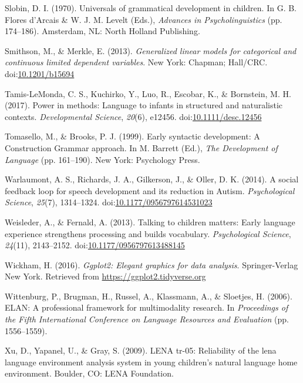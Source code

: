 \documentclass[,man,mask,floatsintext]{apa6}
\begin{document}
\hypertarget{ref-slobin1970universals}{}
Slobin, D. I. (1970). Universals of grammatical development in children.
In G. B. Flores d'Arcais \& W. J. M. Levelt (Eds.), \emph{Advances in
Psycholinguistics} (pp. 174--186). Amsterdam, NL: North Holland
Publishing.

\hypertarget{ref-smithson2013generalized}{}
Smithson, M., \& Merkle, E. (2013). \emph{Generalized linear models for
categorical and continuous limited dependent variables}. New York:
Chapman; Hall/CRC.
doi:\href{https://doi.org/10.1201/b15694}{10.1201/b15694}

\hypertarget{ref-tamislemonda2017power}{}
Tamis-LeMonda, C. S., Kuchirko, Y., Luo, R., Escobar, K., \& Bornstein,
M. H. (2017). Power in methods: Language to infants in structured and
naturalistic contexts. \emph{Developmental Science}, \emph{20}(6),
e12456.
doi:\href{https://doi.org/10.1111/desc.12456}{10.1111/desc.12456}

\hypertarget{ref-tomasello1999early}{}
Tomasello, M., \& Brooks, P. J. (1999). Early syntactic development: A
Construction Grammar approach. In M. Barrett (Ed.), \emph{The
Development of Language} (pp. 161--190). New York: Psychology Press.

\hypertarget{ref-warlaumont2014social}{}
Warlaumont, A. S., Richards, J. A., Gilkerson, J., \& Oller, D. K.
(2014). A social feedback loop for speech development and its reduction
in Autism. \emph{Psychological Science}, \emph{25}(7), 1314--1324.
doi:\href{https://doi.org/10.1177/0956797614531023}{10.1177/0956797614531023}

\hypertarget{ref-weisleder2013talking}{}
Weisleder, A., \& Fernald, A. (2013). Talking to children matters: Early
language experience strengthens processing and builds vocabulary.
\emph{Psychological Science}, \emph{24}(11), 2143--2152.
doi:\href{https://doi.org/10.1177/0956797613488145}{10.1177/0956797613488145}

\hypertarget{ref-R-ggplot2}{}
Wickham, H. (2016). \emph{Ggplot2: Elegant graphics for data analysis}.
Springer-Verlag New York. Retrieved from
\url{https://ggplot2.tidyverse.org}

\hypertarget{ref-ELAN}{}
Wittenburg, P., Brugman, H., Russel, A., Klassmann, A., \& Sloetjes, H.
(2006). ELAN: A professional framework for multimodality research. In
\emph{Proceedings of the Fifth International Conference on Language
Resources and Evaluation} (pp. 1556--1559).

\hypertarget{ref-xu2009reliability}{}
Xu, D., Yapanel, U., \& Gray, S. (2009). LENA tr-05: Reliability of the
lena language environment analysis system in young children's natural
language home environment. Boulder, CO: LENA Foundation.

\endgroup
\end{document}
